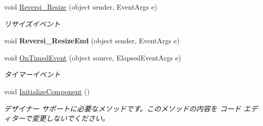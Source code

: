 \begin{DoxyCompactItemize}
void \hyperlink{class_reversi_form_1_1_reversi_ac4868f12e6f15387f8f39f5f1934e610}{Reversi\+\_\+\+Resize} (object sender, Event\+Args e)
\begin{DoxyCompactList}\small\item\em リサイズイベント \end{DoxyCompactList}\item 
\mbox{\label{class_reversi_form_1_1_reversi_a5b88dc4de7186ee1b04a0619221284a9}} 
void {\bfseries Reversi\+\_\+\+Resize\+End} (object sender, Event\+Args e)
\item 
void \hyperlink{class_reversi_form_1_1_reversi_a7c9ef5ff17c4b888f5c891e3ed5dafc2}{On\+Timed\+Event} (object source, Elapsed\+Event\+Args e)
\begin{DoxyCompactList}\small\item\em タイマーイベント \end{DoxyCompactList}\item 
void \hyperlink{class_reversi_form_1_1_reversi_abec0816dd006d05b512d86b45a20af68}{Initialize\+Component} ()
\begin{DoxyCompactList}\small\item\em デザイナー サポートに必要なメソッドです。このメソッドの内容を コード エディターで変更しないでください。 \end{DoxyCompactList}\end{DoxyCompactItemize}
